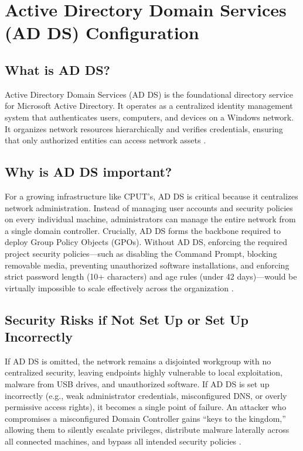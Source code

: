 \chapter{Active Directory Domain Services (AD DS) Configuration}
\label{chap:adds}

\section{What is AD DS?}
\label{sec:what}
Active Directory Domain Services (AD DS) is the foundational directory service for Microsoft Active Directory. It operates as a centralized identity management system that authenticates users, computers, and devices on a Windows network. It organizes network resources hierarchically and verifies credentials, ensuring that only authorized entities can access network assets \cite{msft-adds-overview}.

\section{Why is AD DS important?}
\label{sec:why}
For a growing infrastructure like CPUT's, AD DS is critical because it centralizes network administration. Instead of managing user accounts and security policies on every individual machine, administrators can manage the entire network from a single domain controller. Crucially, AD DS forms the backbone required to deploy Group Policy Objects (GPOs). Without AD DS, enforcing the required project security policies---such as disabling the Command Prompt, blocking removable media, preventing unauthorized software installations, and enforcing strict password length (10+ characters) and age rules (under 42 days)---would be virtually impossible to scale effectively across the organization \cite{msft-gpo-sec}.

\section{Security Risks if Not Set Up or Set Up Incorrectly}
\label{sec:risks}
If AD DS is omitted, the network remains a disjointed workgroup with no centralized security, leaving endpoints highly vulnerable to local exploitation, malware from USB drives, and unauthorized software. If AD DS is set up incorrectly (e.g., weak administrator credentials, misconfigured DNS, or overly permissive access rights), it becomes a single point of failure. An attacker who compromises a misconfigured Domain Controller gains ``keys to the kingdom,'' allowing them to silently escalate privileges, distribute malware laterally across all connected machines, and bypass all intended security policies \cite{msft-sec-guidelines}.

